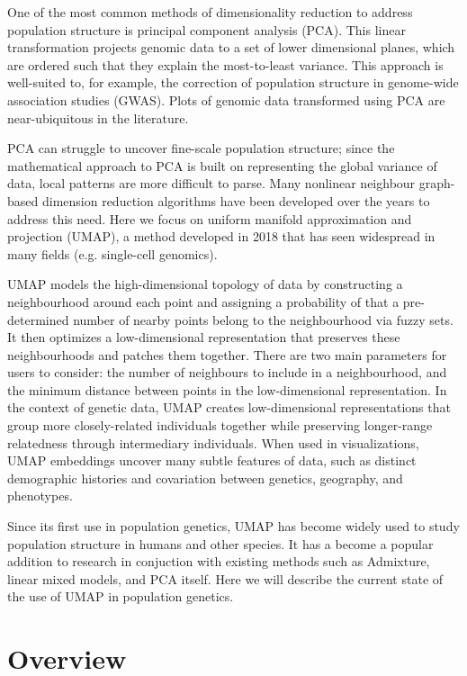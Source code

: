 \documentclass[12pt]{article}
\begin{document}
One of the most common methods of dimensionality reduction to address population structure is principal component analysis (PCA). This linear transformation projects genomic data to a set of lower dimensional planes, which are ordered such that they explain the most-to-least variance. This approach is well-suited to, for example, the correction of population structure in genome-wide association studies (GWAS).\cite{patterson2006population} Plots of genomic data transformed using PCA are near-ubiquitous in the literature.

PCA can struggle to uncover fine-scale population structure; since the mathematical approach to PCA is built on representing the global variance of data, local patterns are more difficult to parse. Many nonlinear neighbour graph-based dimension reduction algorithms have been developed over the years to address this need. Here we focus on uniform manifold approximation and projection (UMAP)\cite{mcinnes_umap_2018}, a method developed in 2018 that has seen widespread in many fields (e.g. single-cell genomics\cite{becht_dimensionality_2019}). 

UMAP models the high-dimensional topology of data by constructing a neighbourhood around each point and assigning a probability of that a pre-determined number of nearby points belong to the neighbourhood via fuzzy sets. It then optimizes a low-dimensional representation that preserves these neighbourhoods and patches them together. There are two main parameters for users to consider: the number of neighbours to include in a neighbourhood, and the minimum distance between points in the low-dimensional representation. In the context of genetic data, UMAP creates low-dimensional representations that group more closely-related individuals together while preserving longer-range relatedness through intermediary individuals. When used in visualizations, UMAP embeddings uncover many subtle features of data, such as distinct demographic histories and covariation between genetics, geography, and phenotypes\cite{diaz-papkovich_umap_2019}.

Since its first use in population genetics, UMAP has become widely used to study population structure in humans and other species. It has a become a popular addition to research in conjuction with existing methods such as Admixture, linear mixed models, and PCA itself. Here we will describe the current state of the use of UMAP in population genetics.

\section*{Overview}
\end{document}
